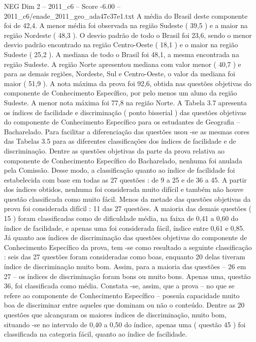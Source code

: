 \begin{textsample}{NEG Dim 2 – 2011\_c6 – Score -6.00 – 2011\_c6/enade\_2011\_geo\_ada47c37e1.txt}
A média do Brasil deste componente foi de 42,4.
A menor média foi observada na região Sudeste ( 39,5 ) e a maior na região Nordeste ( 48,3 ).
O desvio padrão de todo o Brasil foi 23,6, sendo o menor desvio padrão encontrado na região Centro-Oeste ( 18,1 ) e o maior na região Sudeste ( 25,2 ).
A mediana de todo o Brasil foi 48,1, a mesma encontrada na região Sudeste.
A região Norte apresentou mediana com valor menor ( 40,7 ) e para as demais regiões, Nordeste, Sul e Centro-Oeste, o valor da mediana foi maior ( 51,9 ).
A nota máxima da prova foi 92,6, obtida nas questões objetivas do componente de Conhecimento Específico, por pelo menos um aluno da região Sudeste.
A menor nota máxima foi 77,8 na região Norte.
A Tabela 3.7 apresenta os índices de facilidade e discriminação ( ponto bisserial ) das questões objetivas do componente de Conhecimento Específico para os estudantes de Geografia – Bacharelado.
Para facilitar a diferenciação das questões usou -se as mesmas cores das Tabelas 3.5 para as diferentes classificações dos índices de facilidade e de discriminação.
Dentre as questões objetivas da parte da prova relativa ao componente de Conhecimento Específico do Bacharelado, nenhuma foi anulada pela Comissão.
Desse modo, a classificação quanto ao índice de facilidade foi estabelecida com base em todas as 27 questões : de 9 a 25 e de 36 a 45.
A partir dos índices obtidos, nenhuma foi considerada muito difícil e também não houve questão classificada como muito fácil.
Menos da metade das questões objetivas da prova foi considerada difícil : 11 das 27 questões.
A maioria das demais questões ( 15 ) foram classificadas como de dificuldade média, na faixa de 0,41 a 0,60 do índice de facilidade, e apenas uma foi considerada fácil, índice entre 0,61 e 0,85.
Já quanto aos índices de discriminação das questões objetivas do componente de Conhecimento Específico da prova, tem -se como resultado a seguinte classificação : seis das 27 questões foram consideradas como boas, enquanto 20 delas tiveram índice de discriminação muito bom.
Assim, para a maioria das questões – 26 em 27 – os índices de discriminação foram bons ou muito bons.
Apenas uma, questão 36, foi classificada como média.
Constata -se, assim, que a prova – no que se refere ao componente de Conhecimento Específico – possuía capacidade muito boa de discriminar entre aqueles que dominam ou não o conteúdo.
Dentre as 20 questões que alcançaram os maiores índices de discriminação, muito bom, situando -se no intervalo de 0,40 a 0,50 do índice, apenas uma ( questão 45 ) foi classificada na categoria fácil, quanto ao índice de facilidade.

\end{textsample}
